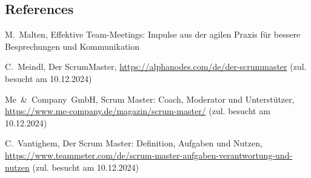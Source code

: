\documentclass[5pt, final]{beamer}
\begin{document}
\begin{frame}[t]
\begin{multicols}{3}
			
			
			
			\subsection{References}
						
			\begin{thebibliography}{99}
				
%				
%				
				
				 M.~Malten, Effektive Team-Meetings: Impulse aus der agilen Praxis für bessere Besprechungen und Kommunikation
				
				 C.~Meindl, Der ScrumMaster, \url{https://alphanodes.com/de/der-scrummaster} (zul. besucht am 10.12.2024)
				
				 Me~\&~Company~GmbH, Scrum Master: Coach, Moderator und Unterstützer, \url{https://www.me-company.de/magazin/scrum-master/} (zul. besucht am 10.12.2024)
				
				 C.~Vantighem, Der Scrum Master: Definition, Aufgaben und Nutzen, \url{https://www.teammeter.com/de/scrum-master-aufgaben-verantwortung-und-nutzen} (zul. besucht am 10.12.2024)
				

\end{thebibliography}
\end{multicols}
\end{frame}
\end{document}
